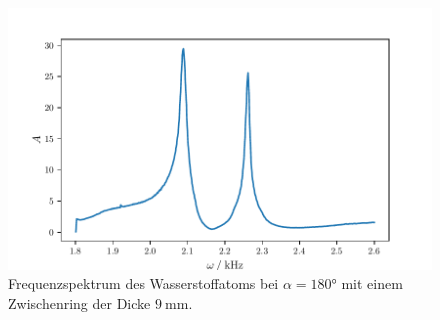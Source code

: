 \begin{figure}
    \centering
    \includegraphics{build/h9ring.pdf}
    \caption{Frequenzspektrum des Wasserstoffatoms bei $\alpha = \ang{180}$ mit einem Zwischenring der Dicke $\qty{9}{\milli\meter}$.}
    \label{fig:h9ring}
\end{figure}
\FloatBarrier

